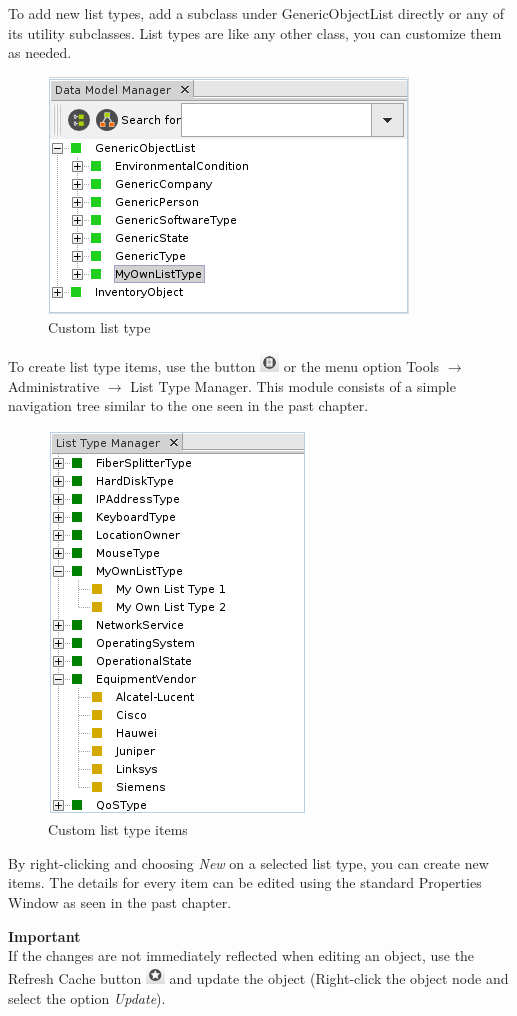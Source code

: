 \documentclass[a4paper]{article}
\begin{document}
	To add new list types, add a subclass under GenericObjectList directly or any of its utility subclasses. List types are like any other class, you can customize them as needed.
	\begin{figure}[h!]
		\centering
		\includegraphics[width=0.3\linewidth]{img/list_type_own_type.png}
		\caption{Custom list type}
		\label{fig:list_type_own_type}
	\end{figure}
	 To create list type items, use the button \includegraphics[width=0.5cm]{img/icon_list_type_manager.png} or the menu option Tools $\rightarrow$ Administrative $\rightarrow$ List Type Manager. This module consists of a simple navigation tree similar to the one seen in the past chapter.
	 \begin{figure}[h!]
	 	\centering
	 	\includegraphics[width=0.4\linewidth]{img/list_type_list_type_items.png}
	 	\caption{Custom list type items}
	 	\label{fig:list_type_list_type_items}
	 \end{figure}
	 
	 By right-clicking and choosing \textit{New} on a selected list type, you can create new items. The details for every item can be edited using the standard Properties Window as seen in the past chapter. 
	 \newpage
	 \begin{framed} {\large \textbf{Important}}\\
	 	If the changes are not immediately reflected when editing an object, use the Refresh Cache button  \includegraphics[width=0.5cm]{img/icon_refresh_cache.png} and update the object (Right-click the object node and select the option \textit{Update}).
	 \end{framed}
	 
\end{document}
